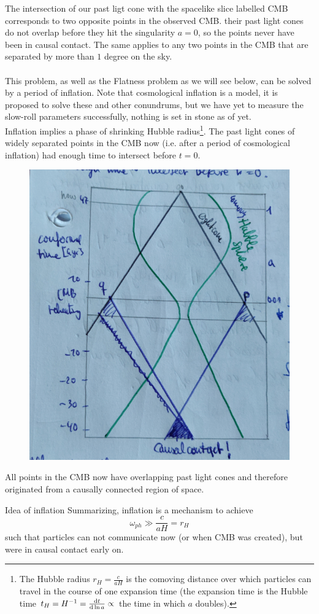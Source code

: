  The intersection of our past ligt cone with the spacelike slice labelled CMB corresponds to two opposite points in the observed CMB. their past light cones do not overlap before they hit the singularity $a=0$, so the points never have been in causal contact. The same applies to any two points in the CMB that are separated by more than $1$ degree on the sky.
\\
\\
This problem, as well as the Flatness problem as we will see below, can be solved by a period of inflation. Note that cosmological inflation is a model, it is proposed to solve these and other conundrums, but we have yet to measure the slow-roll parameters successfully, nothing is set in stone as of yet.\\
Inflation implies a phase of shrinking Hubble radius\footnote{The Hubble radius $r_H =\frac{c}{aH}$ is the comoving distance over which particles can travel in the course of one expansion time (the expansion time is the Hubble time $t_H = H^{-1} = \frac{\mathrm{d} t}{\mathrm{d} \ln a}\propto$ the time in which $a$ doubles).}. 
The past light cones of widely separated points in the CMB now (i.e. after a period of cosmological inflation) had enough time to intersect before $t=0$.



\begin{figure}[h!]
	\centering
	\includegraphics[width=0.7\linewidth]{gfx/Inflation}
	\caption{}
	\label{fig:inflation}
\end{figure}
All points in the CMB now have overlapping past light cones and therefore originated from a causally connected region of space.\\
\begin{mybox}{Idea of inflation}
	Summarizing, inflation is a mechanism to achieve 
	\begin{equation}
		\omega_{ph} \gg \frac{c}{a H} = r_H
	\end{equation}
	such that particles can not communicate now (or when CMB was created), but were in causal contact early on.
\end{mybox}



